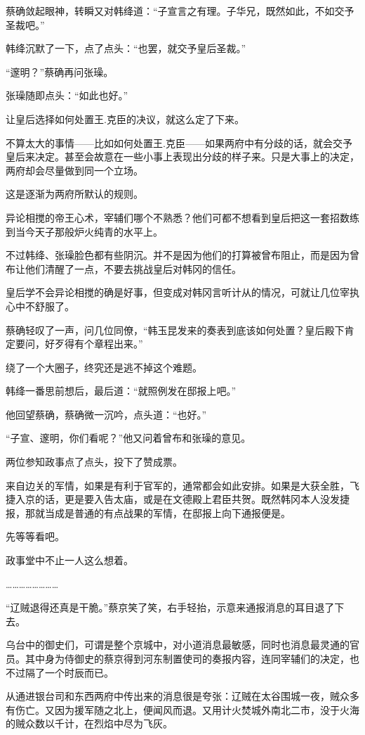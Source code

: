 蔡确敛起眼神，转瞬又对韩绛道：“子宣言之有理。子华兄，既然如此，不如交予圣裁吧。”

韩绛沉默了一下，点了点头：“也罢，就交予皇后圣裁。”

“邃明？”蔡确再问张璪。

张璪随即点头：“如此也好。”

让皇后选择如何处置王.克臣的决议，就这么定了下来。

不算太大的事情——比如如何处置王.克臣——如果两府中有分歧的话，就会交予皇后来决定。甚至会故意在一些小事上表现出分歧的样子来。只是大事上的决定，两府却会尽量做到同一个立场。

这是逐渐为两府所默认的规则。

异论相搅的帝王心术，宰辅们哪个不熟悉？他们可都不想看到皇后把这一套招数练到当今天子那般炉火纯青的水平上。

不过韩绛、张璪脸色都有些阴沉。并不是因为他们的打算被曾布阻止，而是因为曾布让他们清醒了一点，不要去挑战皇后对韩冈的信任。

皇后学不会异论相搅的确是好事，但变成对韩冈言听计从的情况，可就让几位宰执心中不舒服了。

蔡确轻叹了一声，问几位同僚，“韩玉昆发来的奏表到底该如何处置？皇后殿下肯定要问，好歹得有个章程出来。”

绕了一个大圈子，终究还是逃不掉这个难题。

韩绛一番思前想后，最后道：“就照例发在邸报上吧。”

他回望蔡确，蔡确微一沉吟，点头道：“也好。”

“子宣、邃明，你们看呢？”他又问着曾布和张璪的意见。

两位参知政事点了点头，投下了赞成票。

来自边关的军情，如果是有利于官军的，通常都会如此安排。如果是大获全胜，飞捷入京的话，更是要入告太庙，或是在文德殿上君臣共贺。既然韩冈本人没发捷报，那就当成是普通的有点战果的军情，在邸报上向下通报便是。

先等等看吧。

政事堂中不止一人这么想着。

……………………

“辽贼退得还真是干脆。”蔡京笑了笑，右手轻抬，示意来通报消息的耳目退了下去。

乌台中的御史们，可谓是整个京城中，对小道消息最敏感，同时也消息最灵通的官员。其中身为侍御史的蔡京得到河东制置使司的奏报内容，连同宰辅们的决定，也不过隔了一个时辰而已。

从通进银台司和东西两府中传出来的消息很是夸张：辽贼在太谷围城一夜，贼众多有伤亡。又因为援军随之北上，便闻风而退。又用计火焚城外南北二市，没于火海的贼众数以千计，在烈焰中尽为飞灰。

